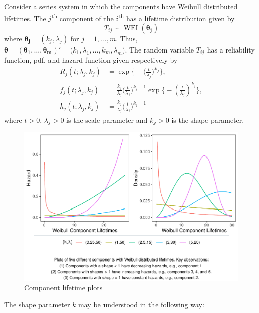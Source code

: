 \documentclass[
]{article}
\begin{document}
Consider a series system in which the components have Weibull
distributed lifetimes. The \(j\)\textsuperscript{th} component of the
\(i\)\textsuperscript{th} has a lifetime distribution given by \[
    T_{i j} \sim \operatorname{WEI}(\boldsymbol{\theta_j})
\] where \(\boldsymbol{\theta_j} = (k_j, \lambda_j)\) for
\(j=1,\ldots,m\). Thus,
\(\boldsymbol{\theta }= (\boldsymbol{\theta_1},\ldots,\boldsymbol{\theta_m})' = \bigl(k_1,\lambda_1,\ldots,k_m,\lambda_m\bigr)\).
The random variable \(T_{i j}\) has a reliability function, pdf, and
hazard function given respectively by \begin{align}
    R_j(t;\lambda_j,k_j)
        &= \exp\biggl\{-\biggl(\frac{t}{\lambda_j}\biggr)^{k_j}\biggr\},\\
    f_j(t;\lambda_j,k_j)
        &= \frac{k_j}{\lambda_j}\biggl(\frac{t}{\lambda_j}\biggr)^{k_j-1}
        \exp\biggl\{-\left(\frac{t}{\lambda_j}\right)^{k_j} \biggr\},\\
    h_j(t;\lambda_j,k_j) \label{eq:weibull_haz}
        &= \frac{k_j}{\lambda_j}\biggl(\frac{t}{\lambda_j}\biggr)^{k_j-1}
\end{align} where \(t > 0\), \(\lambda_j > 0\) is the scale parameter
and \(k_j > 0\) is the shape parameter.

\begin{figure}

{\centering \includegraphics{wei_series_md_files/figure-latex/exp_weib_haz-1} 

}

\caption{Component lifetime plots}\label{fig:exp_weib_haz}
\end{figure}

The shape parameter \(k\) may be understood in the following way:
\end{document}
